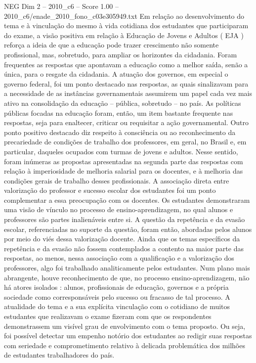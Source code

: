 \begin{textsample}{NEG Dim 2 – 2010\_c6 – Score 1.00 – 2010\_c6/enade\_2010\_fono\_c03e305949.txt}
Em relação ao desenvolvimento do tema e à vinculação do mesmo à vida cotidiana dos estudantes que participaram do exame, a visão positiva em relação à Educação de Jovens e Adultos ( EJA ) reforça a ideia de que a educação pode trazer crescimento não somente profissional, mas, sobretudo, para ampliar os horizontes da cidadania.
Foram frequentes as respostas que apontavam a educação como a melhor saída, senão a única, para o resgate da cidadania.
A atuação dos governos, em especial o governo federal, foi um ponto destacado nas respostas, as quais sinalizavam para a necessidade de as instâncias governamentais assumirem um papel cada vez mais ativo na consolidação da educação – pública, sobretudo – no país.
As políticas públicas focadas na educação foram, então, um item bastante frequente nas respostas, seja para enaltecer, criticar ou requisitar a ação governamental.
Outro ponto positivo destacado diz respeito à consciência ou ao reconhecimento da precariedade de condições de trabalho dos professores, em geral, no Brasil e, em particular, daqueles ocupados com turmas de jovens e adultos.
Nesse sentido, foram inúmeras as propostas apresentadas na segunda parte das respostas com relação à imperiosidade de melhoria salarial para os docentes, e à melhoria das condições gerais de trabalho desses profissionais.
A associação direta entre valorização do professor e sucesso escolar dos estudantes foi um ponto complementar a essa preocupação com os docentes.
Os estudantes demonstraram uma visão de vínculo no processo de ensino-aprendizagem, no qual alunos e professores são partes inalienáveis entre si.
A questão da repetência e da evasão escolar, referenciadas no suporte da questão, foram então, abordadas pelos alunos por meio do viés dessa valorização docente.
Ainda que os temas específicos da repetência e da evasão não fossem contemplados a contento na maior parte das respostas, ao menos, nessa associação com a qualificação e a valorização dos professores, algo foi trabalhado analiticamente pelos estudantes.
Num plano mais abrangente, houve reconhecimento de que, no processo ensino-aprendizagem, não há atores isolados : alunos, profissionais de educação, governos e a própria sociedade como corresponsáveis pelo sucesso ou fracasso de tal processo.
A atualidade do tema e a sua explícita vinculação com o cotidiano de muitos estudantes que realizavam o exame fizeram com que os respondentes demonstrassem um visível grau de envolvimento com o tema proposto.
Ou seja, foi possível detectar um empenho notório dos estudantes ao redigir suas respostas com seriedade e comprometimento relativo à delicada problemática dos milhões de estudantes trabalhadores do país.

\end{textsample}
